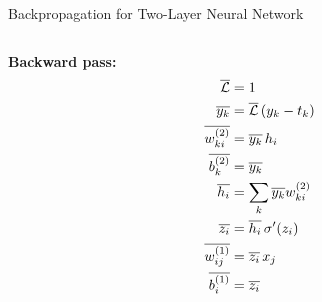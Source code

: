 \documentclass[handout,aspectratio=169]{beamer}
\begin{document}
\begin{frame}{Backpropagation for Two-Layer Neural Network}
\begin{columns}
    \begin{column}{0.45 \linewidth}
      {\bf Backward pass:}
      \begin{align*}
        \overline{{\cal L}} &= 1 \\
        \overline{y_{k}} &= \overline{{\cal L}} \, (y_{k} - t_{k}) \\
        \overline{w^{(2)}_{k i}} &= \overline{y_{k}} \, h_{i} \\
        \overline{b^{(2)}_{k}} &= \overline{y_{k}} \\
        \overline{h_{i}} &= \sum_{k} \overline{y_{k}} w^{(2)}_{k i} \\
        \overline{z_{i}} &= \overline{h_{i}} \, \sigma^\prime(z_{i}) \\
        \overline{w^{(1)}_{i j}} &= \overline{z_{i}} \, x_{j} \\
        \overline{b^{(1)}_{i}} &= \overline{z_{i}} 
      \end{align*}
    \end{column}
  \end{columns}

\end{frame}
\end{document}
